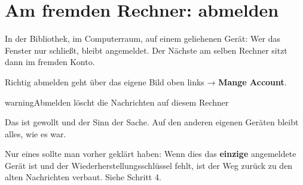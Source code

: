 \documentclass[11pt,parskip=half]{scrartcl}
\begin{document}
\section{Am fremden Rechner: abmelden}

In der Bibliothek, im Computerraum, auf einem geliehenen Gerät: Wer das Fenster
nur schließt, bleibt angemeldet. Der Nächste am selben Rechner sitzt dann im
fremden Konto.

Richtig abmelden geht über das eigene Bild oben links → \textbf{Mange Account}.



\begin{kasten}{warning}{Abmelden löscht die Nachrichten auf diesem Rechner}

Das ist gewollt und der Sinn der Sache. Auf den anderen eigenen Geräten
bleibt alles, wie es war.

Nur eines sollte man vorher geklärt haben: Wenn dies das \textbf{einzige}
angemeldete Gerät ist und der Wiederherstellungsschlüssel fehlt, ist der Weg
zurück zu den alten Nachrichten verbaut. Siehe Schritt 4.

\end{kasten}
\end{document}
